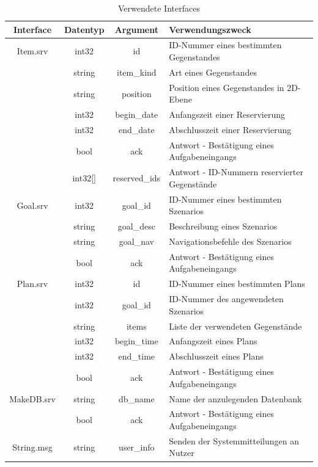\begin{table}[h]
\begin{center}
\begin{tabular}{| c | c | c | l |}
  \hline
  Interface & Datentyp & Argument & Verwendungszweck \\
  \hline
  \hline
  Item.srv   & int32   & id            & ID-Nummer eines bestimmten Gegenstandes\\
             & string  & item\_kind    & Art eines Gegenstandes\\
             & string  & position      & Position eines Gegenstandes in 2D-Ebene\\
             & int32   & begin\_date   & Anfangszeit einer Reservierung\\
             & int32   & end\_date     & Abschlusszeit einer Reservierung\\
             & bool    & ack           & Antwort - Bestätigung eines Aufgabeneingangs\\
             & int32[] & reserved\_ids & Antwort - ID-Nummern reservierter Gegenstände\\
  \hline
  \hline
  Goal.srv   & int32   & goal\_id      & ID-Nummer eines bestimmten Szenarios\\
             & string  & goal\_desc    & Beschreibung eines Szenarios\\
             & string  & goal\_nav     & Navigationsbefehle des Szenarios\\
             & bool    & ack           & Antwort - Bestätigung eines Aufgabeneingangs\\
  \hline
  \hline
  Plan.srv   & int32   & id            & ID-Nummer eines bestimmten Plans\\
             & int32   & goal\_id      & ID-Nummer des angewendeten Szenarios\\
             & string  & items         & Liste der verwendeten Gegenstände\\
             & int32   & begin\_time   & Anfangszeit eines Plans\\
             & int32   & end\_time     & Abschlusszeit eines Plans\\
             & bool    & ack           & Antwort - Bestätigung eines Aufgabeneingangs\\
  \hline
  \hline
  MakeDB.srv & string  & db\_name      & Name der anzulegenden Datenbank\\
             & bool    & ack           & Antwort - Bestätigung eines Aufgabeneingangs\\
  \hline
  \hline
  String.msg & string  & user\_info    & Senden der Systemmitteilungen an Nutzer\\
  \hline
\end{tabular}
\caption{Verwendete Interfaces}
\end{center}
\end{table}

